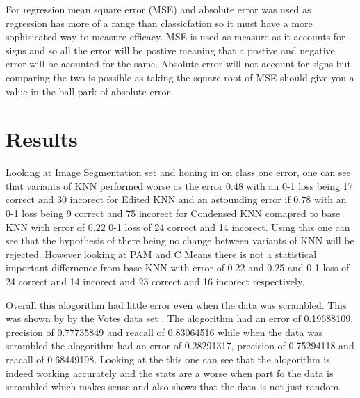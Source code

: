 \documentclass[twoside,11pt]{article}
\begin{document}
For regression mean square error (MSE) and absolute error was used as regression has more of a range than classicfation so it must 
have a more sophisicated way to measure efficacy. MSE is used as measure as it accounts for signs and so all the error will be postive
meaning that a postive and negative error will be acounted for the same. Absolute error will not account for signs but comparing the two
is possible as taking the square root of MSE should give you a value in the ball park of absolute error. 



\section{Results}
Looking at Image Segmentation set and honing in on class one error, one can see that variants of KNN performed worse as the error 0.48 with an 0-1 loss being 
17 correct and 30 incorect for Edited KNN and an astounding error if 0.78 with an 0-1 loss being 9 correct and 75 incorect for Condensed KNN 
comapred to base KNN with error of 0.22 0-1 loss of 24 correct and 14 incorect.  Using this one can see that the hypothesis of there being no change 
between  variants of KNN will be rejected.  However looking at PAM and C Means there is not a statistical important differnence from base KNN with error
of 0.22 and 0.25 and 0-1 loss of 24 correct and 14 incorect and 23 correct and 16 incorect respectively.

Overall this  alogorithm had little error even when the data was scrambled.  
This was shown by by the Votes data set \citep{Vote}. The alogorithm had an error of 0.19688109, precision of 0.77735849
and reacall of 0.83064516 while when the data was scrambled the alogorithm had an error of 0.28291317, precision 
of 0.75294118 and reacall of 0.68449198.  Looking at the this one can see that the alogorithm is indeed working accurately
and the stats are a worse when part fo the data is scrambled which makes sense and also shows that the data is not just 
random. 




\newpage





\vskip 0.2in

\end{document}
